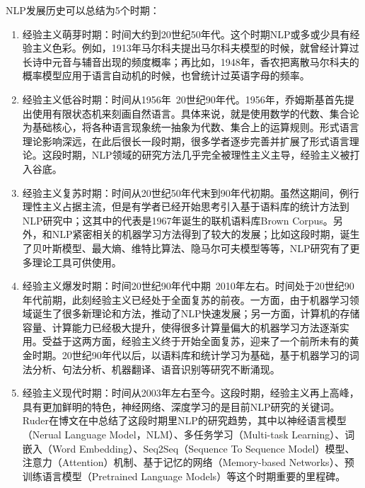 NLP发展历史可以总结为5个时期：
\begin{enumerate}
\item 经验主义萌芽时期：时间大约到20世纪50年代。这个时期NLP或多或少具有经验主义色彩。例如，1913年马尔科夫提出马尔科夫模型\cite{markov1913example}的时候，就曾经计算过长诗中元音与辅音出现的频度概率；再比如，1948年，香农把离散马尔科夫的概率模型应用于语言自动机\cite{shannon1948mathematical}的时候，也曾统计过英语字母的频率。

\item 经验主义低谷时期：时间从1956年~20世纪90年代。1956年，乔姆斯基首先提出使用有限状态机来刻画自然语言\cite{chomsky1956three}。具体来说，就是使用数学的代数、集合论为基础核心，将各种语言现象统一抽象为代数、集合上的运算规则。形式语言理论影响深远，在此后很长一段时期，很多学者逐步完善并扩展了形式语言理论。这段时期，NLP领域的研究方法几乎完全被理性主义主导，经验主义被打入谷底。

\item 经验主义复苏时期：时间从20世纪50年代末到90年代初期。虽然这期间，例行理性主义占据主流，但是有学者已经开始思考引入基于语料库的统计方法到NLP研究中；这其中的代表是1967年诞生的联机语料库Brown Corpus\cite{kuvcera1967computational}。另外，和NLP紧密相关的机器学习方法得到了较大的发展；比如这段时期，诞生了贝叶斯模型、最大熵\cite{jaynes1957information}、维特比算法\cite{viterbi1967error}、隐马尔可夫模型\cite{stratonovich1965conditional}等等，NLP研究有了更多理论工具可供使用。

\item 经验主义爆发时期：时间20世纪90年代中期~2010年左右。时间处于20世纪90年代前期，此刻经验主义已经处于全面复苏的前夜。一方面，由于机器学习领域诞生了很多新理论和方法，推动了NLP快速发展；另一方面，计算机的存储容量、计算能力已经极大提升，使得很多计算量偏大的机器学习方法逐渐实用。受益于这两方面，经验主义终于开始全面复苏，迎来了一个前所未有的黄金时期。20世纪90年代以后，以语料库和统计学习为基础，基于机器学习的词法分析、句法分析、机器翻译、语音识别等研究不断涌现。

\item 经验主义现代时期：时间从2003年左右至今。这段时期，经验主义再上高峰，具有更加鲜明的特色，神经网络、深度学习的是目前NLP研究的关键词。Ruder在博文\cite{ruder2018review}在中总结了这段时期里NLP的研究趋势，其中以神经语言模型（Nerual Language Model，NLM）、多任务学习（Multi-task Learning）、词嵌入（Word Embedding）、Seq2Seq（Sequence To Sequence Model）模型、注意力（Attention）机制、基于记忆的网络（Memory-based Networks）、预训练语言模型（Pretrained Language Models）等这个时期重要的里程碑。

\end{enumerate}

